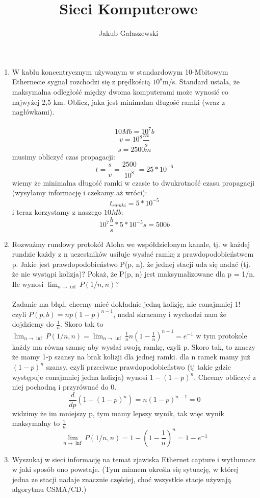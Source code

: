 \documentclass{article}[A4]
\title{Sieci Komputerowe}
\author{Jakub Gałaszewski}
\begin{document}
\maketitle
\begin{enumerate}
	\item{W kablu koncentrycznym używanym w standardowym 10-Mbitowym Ethernecie sygnał rozchodzi się z prędkością $10^8 $m/s. Standard ustala, że maksymalna odległość między dwoma komputerami może wynosić co najwyżej 2,5 km. Oblicz, jaka jest minimalna długość ramki (wraz z nagłówkami).}\\\\
$$10Mb = 10^7 b$$
$$v = 10^8 \frac{m}{s}$$
$$s = 2500 m$$
musimy obliczyć czas propagacji:
$$t = \frac{s}{v}= \frac{2500}{10^8} = 25 * 10^{-6}$$
wiemy że minimalna długość ramki w czasie to dwukrotność czasu propagacji (wysyłamy informację i czekamy aż wróci):
$$t_{ramki} = 5 * 10^{-5}$$
i teraz korzystamy z naszego $10Mb$:
$$10^7 \frac{b}{s} * 5 * 10^{-5} s = 500b$$
\item{Rozważmy rundowy protokół Aloha we współdzielonym kanale, tj. w każdej rundzie każdy z n uczestników usiłuje wysłać ramkę z prawdopodobieństwem p. Jakie jest prawdopodobieństwo P(p, n), że jednej stacji uda się nadać (tj. że nie wystąpi kolizja)? Pokaż, że P(p, n) jest maksymalizowane dla p = 1/n. Ile wynosi $\lim_{n \rightarrow \inf} P(1/n, n)$?}\\\\
Zadanie ma błąd, chcemy mieć dokładnie jedną kolizję, nie conajmniej 1!\\
czyli $P(p, b) = np(1-p)^{n-1}$, nadal skracamy i wychodzi nam że dojdziemy do $\frac{1}{n}$. Skoro tak to $\lim_{n \rightarrow \inf}P(1/n, n) =\lim_{n \rightarrow \inf} \frac{1}{n}n(1-\frac{1}{n})^{n-1} =e^{-1}$
w tym protokole każdy ma równą szansę aby wysłał swoją ramkę, czyli p. Skoro tak, to znaczy że mamy 1-p szansy na brak kolizji dla jednej ramki. dla n ramek mamy już $(1-p)^n$ szansy, czyli przeciwne prawdopodobieństwo (tj takie gdzie występuje conajmniej jedna kolizja) wynosi $1-(1-p)^n$. Chcemy obliczyć z niej pochodną i przyrównać do 0.
$$\frac{d}{dp}(1-(1-p)^n) = n(1-p)^{n-1} = 0$$
widzimy że im mniejszy p, tym mamy lepszy wynik, tak więc wynik maksymalny to $\frac{1}{n}$
$$\lim_{n \rightarrow \inf} P(1/n, n) = 1 - (1-\frac{1}{n})^n = 1 - e^{-1}$$
	\item{Wyszukaj w sieci informację na temat zjawiska Ethernet capture i wytłumacz w jaki sposób ono powstaje. (Tym mianem określa się sytuację, w której jedna ze stacji nadaje znacznie częściej, choć wszystkie stacje używają algorytmu CSMA/CD.)}\\\\

\end{enumerate}
\end{document}
